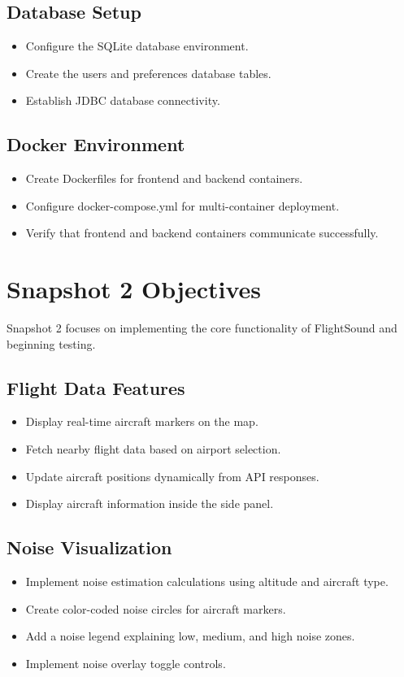 \documentclass[12pt]{article}
\begin{document}
\subsection{Database Setup}
\begin{itemize}
\item Configure the SQLite database environment.
\item Create the users and preferences database tables.
\item Establish JDBC database connectivity.
\end{itemize}

\subsection{Docker Environment}
\begin{itemize}
\item Create Dockerfiles for frontend and backend containers.
\item Configure docker-compose.yml for multi-container deployment.
\item Verify that frontend and backend containers communicate successfully.
\end{itemize}

\newpage

\section{Snapshot 2 Objectives}

Snapshot 2 focuses on implementing the core functionality of FlightSound and beginning testing.

\subsection{Flight Data Features}
\begin{itemize}
\item Display real-time aircraft markers on the map.
\item Fetch nearby flight data based on airport selection.
\item Update aircraft positions dynamically from API responses.
\item Display aircraft information inside the side panel.
\end{itemize}

\subsection{Noise Visualization}
\begin{itemize}
\item Implement noise estimation calculations using altitude and aircraft type.
\item Create color-coded noise circles for aircraft markers.
\item Add a noise legend explaining low, medium, and high noise zones.
\item Implement noise overlay toggle controls.
\end{itemize}
\end{document}
